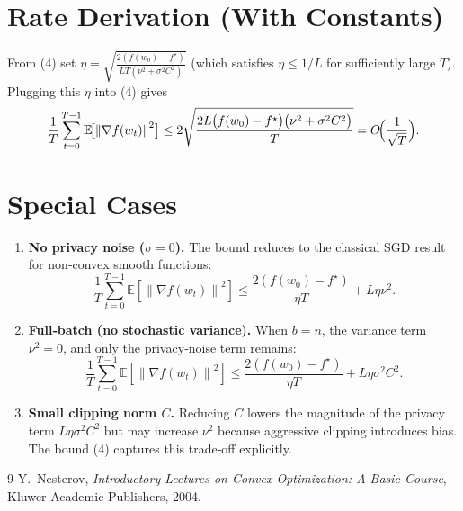 \documentclass{article}
\newcommand{\E}{\mathbb{E}}
\newcommand{\norm}[1]{\left\|#1\right\|}
\newcommand{\grad}{\nabla}
\newcommand{\sig}{\sigma}
\begin{document}
\section*{Rate Derivation (With Constants)}
From (4) set $\eta=\sqrt{\frac{2(f(w_0)-f^\star)}{L T(\nu^2+\sig^2 C^{2})}}$ (which satisfies $\eta\le 1/L$ for sufficiently large $T$). Plugging this $\eta$ into (4) gives
\[
\frac{1}{T}\sum_{t=0}^{T-1}\E\!\bigl[\norm{\grad f(w_t)}^2\bigr]
\le
2\sqrt{\frac{2L\bigl(f(w_0)-f^\star\bigr)\bigl(\nu^2+\sig^2 C^{2}\bigr)}{T}}
=O\!\Bigl(\frac{1}{\sqrt{T}}\Bigr).
\]

\section*{Special Cases}
\begin{enumerate}
\item \textbf{No privacy noise ($\sig=0$).} The bound reduces to the classical SGD result for non‑convex smooth functions:
\[
\frac{1}{T}\sum_{t=0}^{T-1}\E[\norm{\grad f(w_t)}^2]
\le
\frac{2(f(w_0)-f^\star)}{\eta T}+L\eta\nu^2.
\]

\item \textbf{Full‑batch (no stochastic variance).} When $b=n$, the variance term $\nu^2=0$, and only the privacy‑noise term remains:
\[
\frac{1}{T}\sum_{t=0}^{T-1}\E[\norm{\grad f(w_t)}^2]
\le
\frac{2(f(w_0)-f^\star)}{\eta T}+L\eta\sig^2 C^{2}.
\]

\item \textbf{Small clipping norm $C$.} Reducing $C$ lowers the magnitude of the privacy term $L\eta\sig^2 C^{2}$ but may increase $\nu^2$ because aggressive clipping introduces bias. The bound (4) captures this trade‑off explicitly.
\end{enumerate}

\begin{thebibliography}{9}
Y.~Nesterov, \emph{Introductory Lectures on Convex Optimization: A Basic Course}, Kluwer Academic Publishers, 2004.
\end{thebibliography}
\end{document}
